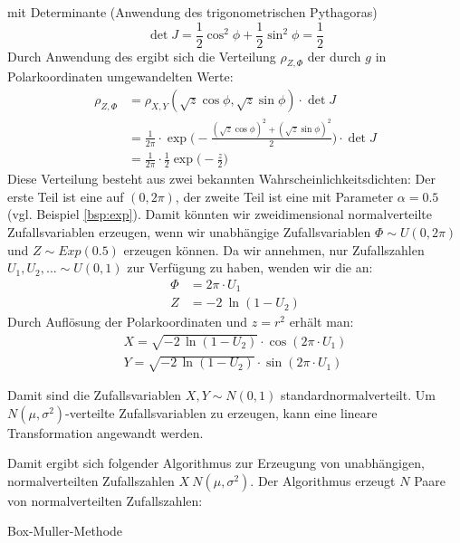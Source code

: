 mit Determinante (Anwendung des trigonometrischen Pythagoras)
\[
\det J = \frac{1}{2}\cos^2\phi + \frac{1}{2}\sin^2\phi = \frac{1}{2}
\]
Durch Anwendung des  ergibt sich die
Verteilung $\rho_{Z,\Phi}$ der durch $g$ in Polarkoordinaten umgewandelten
Werte:
\begin{align*}
\rho_{Z,\Phi} &= \rho_{X,Y}(\sqrt{z}\cos\phi,\sqrt{z}\sin\phi)\cdot\det J \\
  &= \frac{1}{2\pi}\cdot
        \exp\Big(-\frac{(\sqrt{z}\cos\phi)^2+(\sqrt{z}\sin\phi)^2}{2}\Big)
        \cdot\det J \\
  &= \frac{1}{2\pi}\cdot\frac{1}{2}\exp\Big(-\frac{z}{2}\Big)
\end{align*}
Diese Verteilung besteht aus zwei bekannten Wahrscheinlichkeitsdichten: Der
erste Teil ist eine  auf $(0,2\pi)$,
der zweite Teil ist eine  mit
Parameter $\alpha=0.5$ (vgl. Beispiel \ref{bsp:exp}). Damit könnten wir
zweidimensional normalverteilte Zufallsvariablen erzeugen, wenn wir unabhängige
Zufallsvariablen $\Phi\sim U(0,2\pi)$ und $Z\sim Exp(0.5)$ erzeugen können.
Da wir annehmen, nur Zufallszahlen $U_1, U_2, ... \sim U(0,1)$ zur Verfügung zu
haben, wenden wir die  an:
\begin{align*}
\Phi &= 2\pi \cdot U_1 \\
Z &= -2\ \ln(1-U_2)
\end{align*}
Durch Auflösung der Polarkoordinaten und $z = r^2$ erhält man:
\begin{align*}
X = \sqrt{-2\,\ln(1-U_2)}\cdot\cos(2\pi\cdot U_1) \\
Y = \sqrt{-2\,\ln(1-U_2)}\cdot\sin(2\pi\cdot U_1)
\end{align*}

Damit sind die Zufallsvariablen $X,Y \sim N(0,1)$ standardnormalverteilt. Um
$N(\mu, \sigma^2)$-verteilte Zufallsvariablen zu erzeugen, kann eine lineare
Transformation angewandt werden.

\medskip
Damit ergibt sich folgender Algorithmus zur Erzeugung von unabhängigen,
normalverteilten Zufallszahlen $X~N(\mu, \sigma^2)$. Der Algorithmus erzeugt
$N$ Paare von normalverteilten Zufallszahlen:

\begin{algorithm}[h!]


\caption{Box-Muller-Methode}\label{algo:box-muller}
\end{algorithm}

